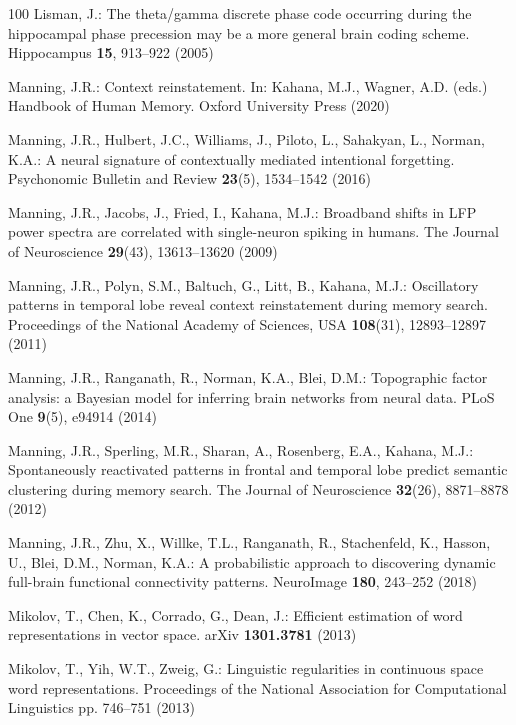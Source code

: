 \documentclass[runningheads]{llncs}
\begin{document}
\begin{thebibliography}{100}
Lisman, J.: The theta/gamma discrete phase code occurring during the
  hippocampal phase precession may be a more general brain coding scheme.
  Hippocampus  \textbf{15},  913--922 (2005)

Manning, J.R.: Context reinstatement. In: Kahana, M.J., Wagner, A.D. (eds.)
  Handbook of Human Memory. {Oxford} {University} Press (2020)

Manning, J.R., Hulbert, J.C., Williams, J., Piloto, L., Sahakyan, L., Norman,
  K.A.: A neural signature of contextually mediated intentional forgetting.
  Psychonomic Bulletin and Review  \textbf{23}(5),  1534--1542 (2016)

Manning, J.R., Jacobs, J., Fried, I., Kahana, M.J.: Broadband shifts in {LFP}
  power spectra are correlated with single-neuron spiking in humans. The
  Journal of Neuroscience  \textbf{29}(43),  13613--13620 (2009)

Manning, J.R., Polyn, S.M., Baltuch, G., Litt, B., Kahana, M.J.: Oscillatory
  patterns in temporal lobe reveal context reinstatement during memory search.
  Proceedings of the National Academy of Sciences, {USA}  \textbf{108}(31),
  12893--12897 (2011)

Manning, J.R., Ranganath, R., Norman, K.A., Blei, D.M.: Topographic factor
  analysis: a {B}ayesian model for inferring brain networks from neural data.
  {PLoS} One  \textbf{9}(5),  e94914 (2014)

Manning, J.R., Sperling, M.R., Sharan, A., Rosenberg, E.A., Kahana, M.J.:
  Spontaneously reactivated patterns in frontal and temporal lobe predict
  semantic clustering during memory search. The Journal of Neuroscience
  \textbf{32}(26),  8871--8878 (2012)

Manning, J.R., Zhu, X., Willke, T.L., Ranganath, R., Stachenfeld, K., Hasson,
  U., Blei, D.M., Norman, K.A.: A probabilistic approach to discovering dynamic
  full-brain functional connectivity patterns. {NeuroImage}  \textbf{180},
  243--252 (2018)

Mikolov, T., Chen, K., Corrado, G., Dean, J.: Efficient estimation of word
  representations in vector space. {arXiv}  \textbf{1301.3781} (2013)

Mikolov, T., Yih, W.T., Zweig, G.: Linguistic regularities in continuous space
  word representations. Proceedings of the National Association for
  Computational Linguistics pp. 746--751 (2013)


\end{thebibliography}
\end{document}
